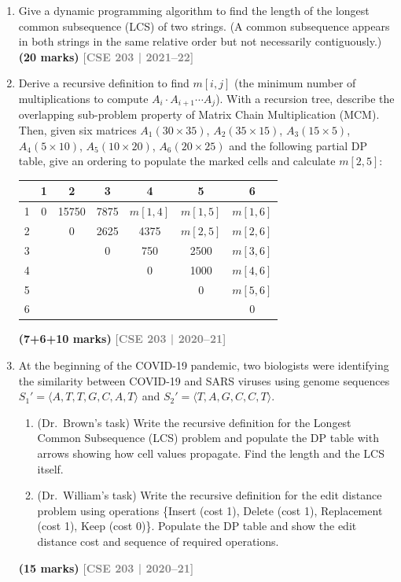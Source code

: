 \documentclass[12pt,a3paper]{article}
\newcommand{\yr}[1]{\hfill\textcolor{gray}{\small\textbf{[#1]}}}
\newcommand{\mk}[1]{\textcolor{orange!70!black}{\small\textbf{(#1 marks)}}}
\begin{document}
\begin{enumerate}
\item Give a dynamic programming algorithm to find the length of the longest common subsequence (LCS) of two strings. (A common subsequence appears in both strings in the same relative order but not necessarily contiguously.) \mk{20}
\yr{CSE 203 | 2021--22}

\item Derive a recursive definition to find $m[i,j]$ (the minimum number of multiplications to compute $A_i \cdot A_{i+1} \cdots A_j$). With a recursion tree, describe the overlapping sub-problem property of Matrix Chain Multiplication (MCM). Then, given six matrices $A_1(30\times35)$, $A_2(35\times15)$, $A_3(15\times5)$, $A_4(5\times10)$, $A_5(10\times20)$, $A_6(20\times25)$ and the following partial DP table, give an ordering to populate the marked cells and calculate $m[2,5]$:
\begin{center}
\begin{tabular}{c|cccccc}
\toprule
 & 1 & 2 & 3 & 4 & 5 & 6 \\
\midrule
1 & 0 & 15750 & 7875 & $m[1,4]$ & $m[1,5]$ & $m[1,6]$ \\
2 & & 0 & 2625 & 4375 & $m[2,5]$ & $m[2,6]$ \\
3 & & & 0 & 750 & 2500 & $m[3,6]$ \\
4 & & & & 0 & 1000 & $m[4,6]$ \\
5 & & & & & 0 & $m[5,6]$ \\
6 & & & & & & 0 \\
\bottomrule
\end{tabular}
\end{center}
\mk{7+6+10}
\yr{CSE 203 | 2020--21}

\item At the beginning of the COVID-19 pandemic, two biologists were identifying the similarity between COVID-19 and SARS viruses using genome sequences $S_1' = \langle A,T,T,G,C,A,T \rangle$ and $S_2' = \langle T,A,G,C,C,T \rangle$.
\begin{enumerate}
  \item (Dr.\ Brown's task) Write the recursive definition for the Longest Common Subsequence (LCS) problem and populate the DP table with arrows showing how cell values propagate. Find the length and the LCS itself.
  \item (Dr.\ William's task) Write the recursive definition for the edit distance problem using operations \{Insert (cost 1), Delete (cost 1), Replacement (cost 1), Keep (cost 0)\}. Populate the DP table and show the edit distance cost and sequence of required operations.
\end{enumerate}
\mk{15}
\yr{CSE 203 | 2020--21}


\end{enumerate}
\end{document}
